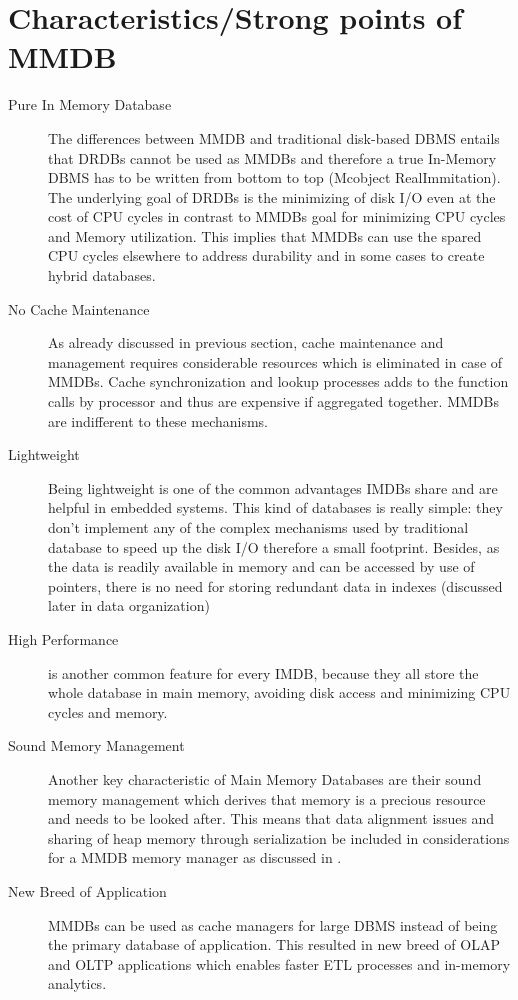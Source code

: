 \documentclass[12pt]{article} %
\begin{document}
\section{Characteristics/Strong points of MMDB}
\begin{description}

\item[Pure In Memory Database]The differences between MMDB and traditional disk-based DBMS entails that DRDBs cannot be used as MMDBs and therefore a true In-Memory DBMS has to be written from bottom to top (Mcobject RealImmitation). The underlying goal of DRDBs is the minimizing of disk I/O even at the cost of CPU cycles in contrast to MMDBs goal for minimizing CPU cycles and Memory utilization. This implies that MMDBs can use the spared CPU cycles elsewhere to address durability and in some cases to create hybrid databases. 

\item[No Cache Maintenance] As already discussed in previous section, cache maintenance and management requires considerable resources which is eliminated in case of MMDBs. Cache synchronization and lookup processes adds to the function calls by processor and thus are expensive if aggregated together. MMDBs are indifferent to these mechanisms.

\item[Lightweight] Being lightweight is one of the common advantages IMDBs share and are helpful in embedded systems. This kind of databases is really simple: they don't implement any of the complex mechanisms used by traditional database to speed up the disk I/O therefore a small footprint.
Besides, as the data is readily available in memory and can be accessed by use of pointers, there is no need for storing redundant data in indexes (discussed later in data organization)

\item[High Performance] is another common feature for every IMDB, because they all store the whole database in main memory, avoiding disk access and minimizing CPU cycles and memory.

\item[Sound Memory Management ]Another key characteristic of Main Memory Databases are their sound memory management which derives that memory is a precious resource and needs to be looked after. This means that data alignment issues and sharing of heap memory through serialization be included in considerations for a MMDB memory manager as discussed in \cite{Mcobject-RealvsImmi}.

\item[New Breed of Application] MMDBs can be used as cache managers for large DBMS instead of being the primary database of application. This resulted in new breed of OLAP and OLTP applications which enables faster ETL processes and in-memory analytics.

\end{description}
\end{document}
